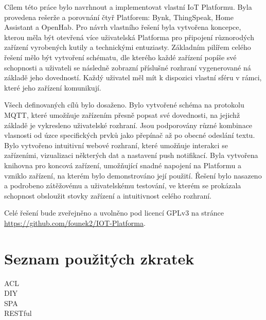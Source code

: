 \documentclass[thesis=B,czech]{FITthesis}[2019/12/23]
\begin{document}
\begin{conclusion}
    Cílem této práce bylo navrhnout a implementovat vlastní IoT Platformu. Byla provedena rešerže a porovnání čtyř Platforem: Bynk, ThingSpeak, Home Assistant a OpenHab. Pro návrh vlastního řešení byla vytvořena koncepce, kterou měla být otevřená více uživatelská Platforma pro připojení různorodých zařízení vyrobených kutily a technickými entuziasty. Základním pilířem celého řešení mělo být vytvoření schématu, dle kterého každé zařízení popíše své schopnosti a uživateli se následně zobrazní příslušné rozhraní vygenerované ná základě jeho dovedností. Každý uživatel měl mít k dispozici vlastní sféru v rámci, které jeho zařízení komunikují.

    Všech definovaných cílů bylo dosaženo. Bylo vytvořené schéma na protokolu MQTT, které umožňuje zařízením přesně popsat své dovednosti, na jejichž základě je vykresleno uživatelské rozhraní. Jsou podporovány různé kombinace vlasnosti od úzce specifických prvků jako přepínač až po obecné odeslání textu. Bylo vytvořeno intuitivní webové rozhraní, které umožňuje interakci se zařízeními, vizualizaci některých dat a nastavení push notifikací. Byla vytvořena knihovna pro koncová zařízení, umožňující snadné napojení na Platformu a vzniklo zařízení, na kterém bylo demonstrováno její použití. Řešení bylo nasazeno a podrobeno zátěžovému a uživatelskému testování, ve kterém se prokázala schopnost obsloužit stovky zařízení a intuitivnost celého rozhraní.

    Celé řešení bude zveřejněno a uvolněno pod licencí GPLv3 na stránce \url{https://github.com/founek2/IOT-Platforma}.
\end{conclusion}




\appendix

\chapter{Seznam použitých zkratek}
\begin{description}
    \item[ACL]
    \item[DIY]
    \item[SPA]
    \item[RESTful]
\end{description}
\end{document}

